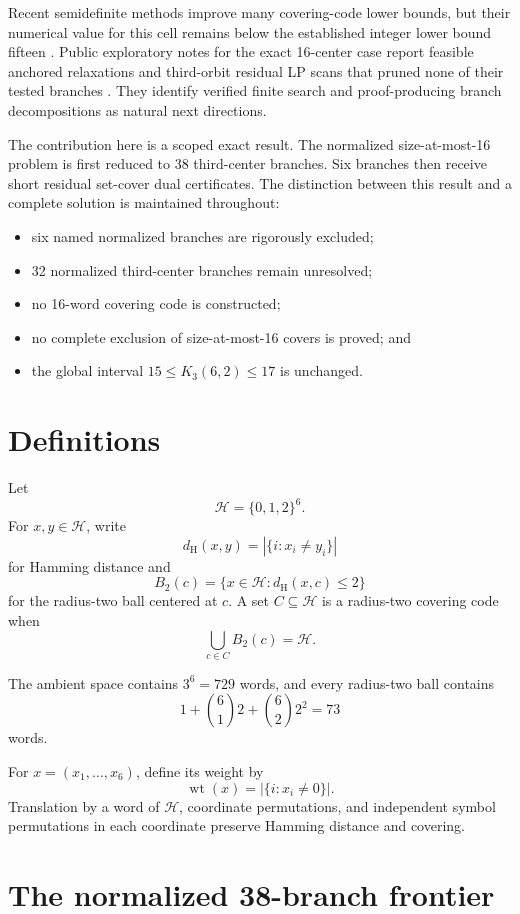 \documentclass[11pt]{article}
\newcommand{\Hspace}{\mathcal{H}}
\newcommand{\dist}{d_{\mathrm H}}
\newcommand{\wt}{\operatorname{wt}}
\begin{document}
Recent semidefinite methods improve many covering-code lower bounds, but
their numerical value for this cell remains below the established integer
lower bound fifteen \cite{gijswijt-polak-2026}.  Public exploratory notes
for the exact 16-center case report feasible anchored relaxations and
third-orbit residual LP scans that pruned none of their tested branches
\cite{covering-codes-lean-failures}.  They identify verified finite search
and proof-producing branch decompositions as natural next directions.

The contribution here is a scoped exact result.  The normalized
size-at-most-16 problem is first reduced to 38 third-center branches.  Six
branches then receive short residual set-cover dual certificates.  The
distinction between this result and a complete solution is maintained
throughout:

\begin{itemize}[leftmargin=2em]
  \item six named normalized branches are rigorously excluded;
  \item 32 normalized third-center branches remain unresolved;
  \item no 16-word covering code is constructed;
  \item no complete exclusion of size-at-most-16 covers is proved; and
  \item the global interval \(15\leq K_3(6,2)\leq 17\) is unchanged.
\end{itemize}

\section{Definitions}

Let
\[
  \Hspace=\{0,1,2\}^6.
\]
For \(x,y\in\Hspace\), write
\[
  \dist(x,y)=|\{i:x_i\neq y_i\}|
\]
for Hamming distance and
\[
  B_2(c)=\{x\in\Hspace:\dist(x,c)\leq 2\}
\]
for the radius-two ball centered at \(c\).  A set \(C\subseteq\Hspace\)
is a radius-two covering code when
\[
  \bigcup_{c\in C}B_2(c)=\Hspace.
\]

The ambient space contains \(3^6=729\) words, and every radius-two ball
contains
\[
  1+\binom61 2+\binom62 2^2=73
\]
words.

For \(x=(x_1,\ldots,x_6)\), define its weight by
\[
  \wt(x)=|\{i:x_i\neq 0\}|.
\]
Translation by a word of \(\Hspace\), coordinate permutations, and
independent symbol permutations in each coordinate preserve Hamming
distance and covering.

\section{The normalized 38-branch frontier}
\end{document}
